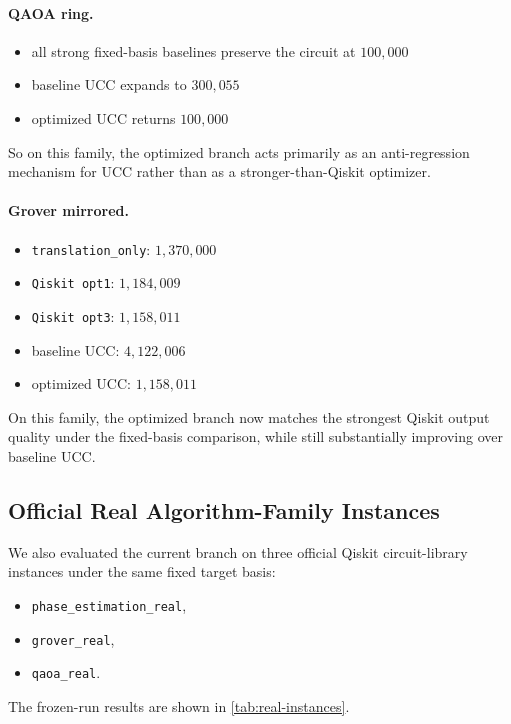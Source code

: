 \documentclass[11pt]{article}
\begin{document}
\paragraph{QAOA ring.}
\begin{itemize}[leftmargin=1.5em]
    \item all strong fixed-basis baselines preserve the circuit at $100{,}000$
    \item baseline UCC expands to $300{,}055$
    \item optimized UCC returns $100{,}000$
\end{itemize}
So on this family, the optimized branch acts primarily as an anti-regression mechanism for UCC rather than as a stronger-than-Qiskit optimizer.

\paragraph{Grover mirrored.}
\begin{itemize}[leftmargin=1.5em]
    \item \texttt{translation\_only}: $1{,}370{,}000$
    \item \texttt{Qiskit opt1}: $1{,}184{,}009$
    \item \texttt{Qiskit opt3}: $1{,}158{,}011$
    \item baseline UCC: $4{,}122{,}006$
    \item optimized UCC: $1{,}158{,}011$
\end{itemize}
On this family, the optimized branch now matches the strongest Qiskit output quality under the fixed-basis comparison, while still substantially improving over baseline UCC.

\subsection{Official Real Algorithm-Family Instances}

We also evaluated the current branch on three official Qiskit circuit-library instances under the same fixed target basis:
\begin{itemize}[leftmargin=1.5em]
    \item \texttt{phase\_estimation\_real},
    \item \texttt{grover\_real},
    \item \texttt{qaoa\_real}.
\end{itemize}

The frozen-run results are shown in \cref{tab:real-instances}.
\end{document}
